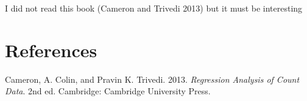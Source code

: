 \documentclass[
]{article}
\newlength{\cslhangindent}
\newlength{\cslentryspacingunit} %
\newenvironment{CSLReferences}[2] %
 {%
  \setlength{\parindent}{0pt}
  \ifodd #1
  \let\oldpar\par
  \def\par{\hangindent=\cslhangindent\oldpar}
  \fi
  \setlength{\parskip}{#2\cslentryspacingunit}
 }%
 {}
\begin{document}
I did not read this book (Cameron and Trivedi 2013) but it must be
interesting

\newpage{}

\hypertarget{references}{%
\section*{References}\label{references}}

\hypertarget{refs}{}
\begin{CSLReferences}{1}{0}
\leavevmode{}%
Cameron, A. Colin, and Pravin K. Trivedi. 2013. \emph{Regression
Analysis of Count Data}. 2nd ed. Cambridge: Cambridge University Press.

\end{CSLReferences}
\end{document}
